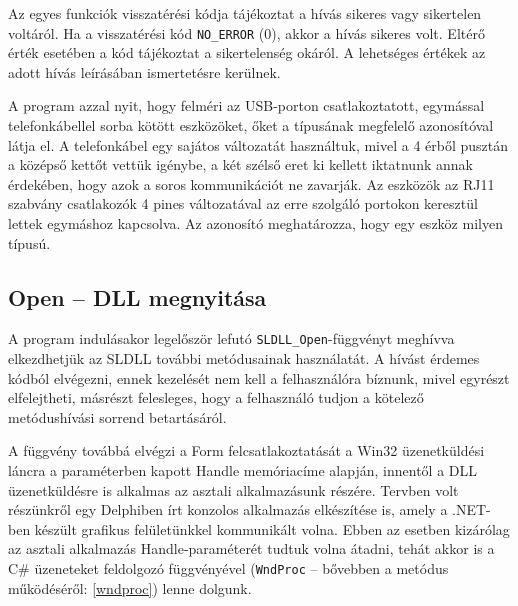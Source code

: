 \documentclass[tocnopagenum]{thesis-ekf}
\theoremstyle{definition}
\theoremstyle{remark}
\begin{document}
	Az egyes funkciók visszatérési kódja tájékoztat a hívás sikeres vagy            
	sikertelen voltáról. Ha a visszatérési kód \verb*|NO_ERROR| (0), akkor a hívás sikeres volt. Eltérő érték esetében a kód tájékoztat a sikertelenség okáról. A lehetséges értékek az adott hívás leírásában ismertetésre kerülnek.  
	
	A program azzal nyit, hogy felméri az USB-porton csatlakoztatott, egymással telefonkábellel sorba kötött eszközöket, őket a típusának megfelelő azonosítóval látja el. A telefonkábel egy sajátos változatát használtuk, mivel a 4 érből pusztán a középső kettőt vettük igénybe, a két szélső eret ki kellett iktatnunk annak érdekében, hogy azok a soros kommunikációt ne zavarják. Az eszközök az RJ11 szabvány csatlakozók 4 pines változatával az erre szolgáló portokon keresztül lettek egymáshoz kapcsolva. Az azonosító meghatározza, hogy egy eszköz milyen típusú. 
	
	\subsection{Open -- DLL megnyitása}
	A program indulásakor legelőször lefutó \verb*|SLDLL_Open|-függvényt meghívva elkezdhetjük az SLDLL további metódusainak használatát. A hívást érdemes kódból elvégezni, ennek kezelését nem kell a felhasználóra bíznunk, mivel egyrészt elfelejtheti, másrészt felesleges, hogy a felhasználó tudjon a kötelező metódushívási sorrend betartásáról. 
	
	A függvény továbbá elvégzi a Form felcsatlakoztatását a Win32 üzenetküldési láncra a paraméterben kapott Handle memóriacíme alapján, innentől a DLL üzenetküldésre is alkalmas az asztali alkalmazásunk részére. Tervben volt részünkről egy Delphiben írt konzolos alkalmazás elkészítése is, amely a .NET-ben készült grafikus felületünkkel kommunikált volna. Ebben az esetben kizárólag az asztali alkalmazás Handle-paraméterét tudtuk volna átadni, tehát akkor is a C\# üzeneteket feldolgozó függvényével (\verb*|WndProc| -- bővebben a metódus működéséről: \ref{wndproc}) lenne dolgunk.
\end{document}
